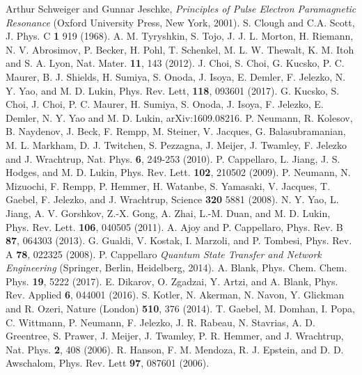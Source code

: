 \documentclass[%
 reprint,
 amsmath,amssymb,
 aps,
]{revtex4-1}
\begin{document}
\begin{thebibliography}{9}
 Arthur Schweiger and Gunnar Jeschke, \textit{Principles of Pulse Electron Paramagnetic Resonance} (Oxford University Press, New York, 2001).
 S. Clough and C.A. Scott, J. Phys. C \textbf{1} 919 (1968).
 A. M. Tyryshkin, S. Tojo, J. J. L. Morton, H. Riemann, N. V. Abrosimov, P. Becker, H. Pohl, T. Schenkel, M. L. W. Thewalt, K. M. Itoh and S. A. Lyon, Nat. Mater. \textbf{11}, 143 (2012).
 J. Choi, S. Choi, G. Kucsko, P. C. Maurer, B. J. Shields, H. Sumiya, S. Onoda, J. Isoya, E. Demler, F. Jelezko, N. Y. Yao, and M. D. Lukin, Phys. Rev. Lett, \textbf{118}, 093601 (2017).
 G. Kucsko, S. Choi, J. Choi, P. C. Maurer, H. Sumiya, S. Onoda, J. Isoya, F. Jelezko, E. Demler, N. Y. Yao and M. D. Lukin, arXiv:1609.08216.
 P. Neumann, R. Kolesov, B. Naydenov, J. Beck, F. Rempp, M. Steiner, V. Jacques, G. Balasubramanian, M. L. Markham, D. J. Twitchen, S. Pezzagna, J. Meijer, J. Twamley, F. Jelezko and J. Wrachtrup, Nat. Phys. \textbf{6}, 249-253 (2010).
 P. Cappellaro, L. Jiang, J. S. Hodges, and M. D. Lukin, Phys. Rev. Lett. \textbf{102}, 210502 (2009).
 P. Neumann, N. Mizuochi, F. Rempp, P. Hemmer, H. Watanbe, S. Yamasaki, V. Jacques, T. Gaebel, F. Jelezko, and J. Wrachtrup, Science \textbf{320} 5881 (2008).
 N. Y. Yao, L. Jiang, A. V. Gorshkov, Z.-X. Gong, A. Zhai, L.-M. Duan, and M. D. Lukin, Phys. Rev. Lett. \textbf{106}, 040505 (2011).
A. Ajoy and P. Cappellaro, 
Phys. Rev. B \textbf{87}, 064303 (2013).
 G. Gualdi, V. Kostak, I. Marzoli, and P. Tombesi, Phys. Rev. A \textbf{78}, 022325 (2008).
 P. Cappellaro \textit{Quantum State Transfer and Network Engineering} (Springer, Berlin, Heidelberg, 2014).
 A. Blank, Phys. Chem. Chem. Phys. \textbf{19}, 5222 (2017).
 E. Dikarov, O. Zgadzai, Y. Artzi, and A. Blank, Phys. Rev. Applied \textbf{6}, 044001 (2016).
 S. Kotler, N. Akerman, N. Navon, Y. Glickman and R. Ozeri, Nature (London) \textbf{510}, 376 (2014).
 T. Gaebel, M. Domhan, I. Popa, C. Wittmann, P. Neumann, F. Jelezko, J. R. Rabeau, N. Stavrias, A. D. Greentree, S. Prawer, J. Meijer, J. Twamley, P. R. Hemmer, and J. Wrachtrup, Nat. Phys. \textbf{2}, 408 (2006).
 R. Hanson, F. M. Mendoza, R. J. Epstein, and D. D. Awschalom, Phys. Rev. Lett \textbf{97}, 087601 (2006).

\end{thebibliography}
\end{document}
